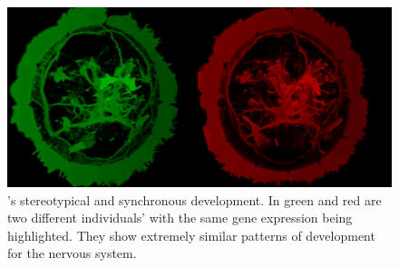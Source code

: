 \begin{figure}[bth]
  \includegraphics[width=\linewidth]{gfx/chapter1/brain_comparison.png}
  \caption{\platyfull{}'s stereotypical and synchronous development. In green and red are two different \platy{} individuals' with the same gene expression being highlighted. They show extremely similar patterns of development for the nervous system.}
  \label{fig:brain_comparison}
\end{figure}

	 
